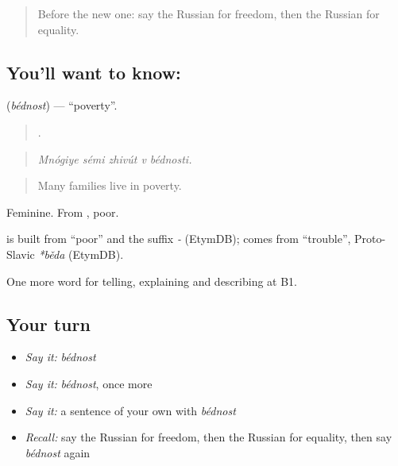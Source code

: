\label{lesson:RU-C367-bednost}



\begin{quote}
Before the new one: say the Russian for freedom, then the Russian for equality.
\end{quote}

\subsection*{You'll want to know: }
\textbf{} (\emph{bédnost}) — \textquotedblleft{}poverty\textquotedblright{}.

\begin{quote}
    .
\end{quote}

\begin{quote}
\emph{Mnógiye sémi zhivút v bédnosti.}
\end{quote}

\begin{quote}
Many families live in poverty.
\end{quote}

Feminine. From \emph{}, poor.

\begin{cousinweb}
\textbf{} is built from \emph{} \textquotedblleft{}poor\textquotedblright{} and the suffix \emph{-} (EtymDB); \emph{} comes from \emph{} \textquotedblleft{}trouble\textquotedblright{}, Proto-Slavic \emph{*běda} (EtymDB).
\end{cousinweb}

\begin{grammarlens}[title={What you've built}]
One more word for telling, explaining and describing at B1.
\end{grammarlens}

\subsection*{Your turn}
\begin{itemize}
\raggedright
  \item \emph{Say it:} \emph{bédnost}
  \item \emph{Say it:} \emph{bédnost}, once more
  \item \emph{Say it:} a sentence of your own with \emph{bédnost}
  \item \emph{Recall:} say the Russian for freedom, then the Russian for equality, then say \emph{bédnost} again
\end{itemize}

